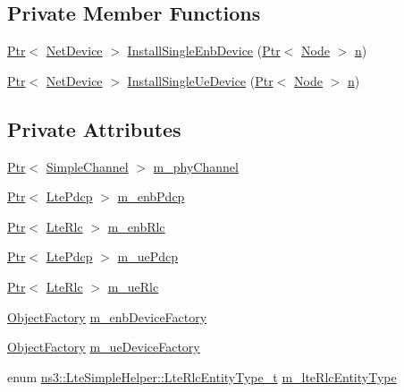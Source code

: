 \subsection*{Private Member Functions}
\begin{DoxyCompactItemize}
\item 
\hyperlink{classns3_1_1Ptr}{Ptr}$<$ \hyperlink{classns3_1_1NetDevice}{Net\+Device} $>$ \hyperlink{classns3_1_1LteSimpleHelper_a11fa8933e6487a366ed4a9652c3b2950}{Install\+Single\+Enb\+Device} (\hyperlink{classns3_1_1Ptr}{Ptr}$<$ \hyperlink{classns3_1_1Node}{Node} $>$ \hyperlink{lte__link__budget__x2__handover__measures_8m_abdb05bc5a064cf642a06c83b3392f148}{n})
\item 
\hyperlink{classns3_1_1Ptr}{Ptr}$<$ \hyperlink{classns3_1_1NetDevice}{Net\+Device} $>$ \hyperlink{classns3_1_1LteSimpleHelper_a4416da6e8b2bb30909b32b9a82dfd4c0}{Install\+Single\+Ue\+Device} (\hyperlink{classns3_1_1Ptr}{Ptr}$<$ \hyperlink{classns3_1_1Node}{Node} $>$ \hyperlink{lte__link__budget__x2__handover__measures_8m_abdb05bc5a064cf642a06c83b3392f148}{n})
\end{DoxyCompactItemize}
\subsection*{Private Attributes}
\begin{DoxyCompactItemize}
\item 
\hyperlink{classns3_1_1Ptr}{Ptr}$<$ \hyperlink{classns3_1_1SimpleChannel}{Simple\+Channel} $>$ \hyperlink{classns3_1_1LteSimpleHelper_a530a0e99b201c4984c1aa0958c0a13c9}{m\+\_\+phy\+Channel}
\item 
\hyperlink{classns3_1_1Ptr}{Ptr}$<$ \hyperlink{classns3_1_1LtePdcp}{Lte\+Pdcp} $>$ \hyperlink{classns3_1_1LteSimpleHelper_a37dce5eb761c35dc100d3bcc89fcaa95}{m\+\_\+enb\+Pdcp}
\item 
\hyperlink{classns3_1_1Ptr}{Ptr}$<$ \hyperlink{classns3_1_1LteRlc}{Lte\+Rlc} $>$ \hyperlink{classns3_1_1LteSimpleHelper_aaedbfdb3f393ccd0d0d65caa992f1646}{m\+\_\+enb\+Rlc}
\item 
\hyperlink{classns3_1_1Ptr}{Ptr}$<$ \hyperlink{classns3_1_1LtePdcp}{Lte\+Pdcp} $>$ \hyperlink{classns3_1_1LteSimpleHelper_aae46bc2f12634e6718f2ea5be639c5bb}{m\+\_\+ue\+Pdcp}
\item 
\hyperlink{classns3_1_1Ptr}{Ptr}$<$ \hyperlink{classns3_1_1LteRlc}{Lte\+Rlc} $>$ \hyperlink{classns3_1_1LteSimpleHelper_aa23d8de7148db42babd25772a0625cb3}{m\+\_\+ue\+Rlc}
\item 
\hyperlink{classns3_1_1ObjectFactory}{Object\+Factory} \hyperlink{classns3_1_1LteSimpleHelper_a4ba91d9ba3663ad56199d198ed18f4ee}{m\+\_\+enb\+Device\+Factory}
\item 
\hyperlink{classns3_1_1ObjectFactory}{Object\+Factory} \hyperlink{classns3_1_1LteSimpleHelper_a0914d0cbe22c19be1d40d0b1be604e71}{m\+\_\+ue\+Device\+Factory}
\item 
enum \hyperlink{classns3_1_1LteSimpleHelper_a9b2b072cbdc391cd95182aa16048befc}{ns3\+::\+Lte\+Simple\+Helper\+::\+Lte\+Rlc\+Entity\+Type\+\_\+t} \hyperlink{classns3_1_1LteSimpleHelper_a8ef164ea370bc4c02ad2f18528478af3}{m\+\_\+lte\+Rlc\+Entity\+Type}
\end{DoxyCompactItemize}
